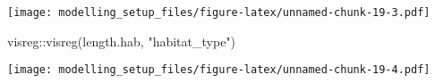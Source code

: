 \documentclass[
]{article}
\newenvironment{Shaded}{\begin{snugshade}}{\end{snugshade}}
\newcommand{\FunctionTok}[1]{\textcolor[rgb]{0.00,0.00,0.00}{#1}}
\newcommand{\NormalTok}[1]{#1}
\newcommand{\SpecialCharTok}[1]{\textcolor[rgb]{0.00,0.00,0.00}{#1}}
\newcommand{\StringTok}[1]{\textcolor[rgb]{0.31,0.60,0.02}{#1}}
\begin{document}
\texttt{[image: modelling\_setup\_files/figure-latex/unnamed-chunk-19-3.pdf]}

\begin{Shaded}
\begin{Highlighting}[]
\NormalTok{visreg}\SpecialCharTok{::}\FunctionTok{visreg}\NormalTok{(length.hab, }\StringTok{"habitat\_type"}\NormalTok{)}
\end{Highlighting}
\end{Shaded}

\texttt{[image: modelling\_setup\_files/figure-latex/unnamed-chunk-19-4.pdf]}
\end{document}
